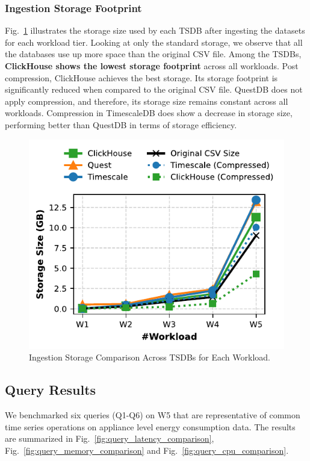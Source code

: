 \documentclass[conference]{IEEEtran}
\begin{document}
\subsubsection{Ingestion Storage Footprint}
Fig.~\ref{fig:ingestion_storage_comparison} illustrates the storage size used by each TSDB after ingesting the datasets for each workload tier. Looking at only the standard storage, we observe that all the databases use up more space than the original CSV file. Among the TSDBs, \textbf{ClickHouse shows the lowest storage footprint} across all workloads. Post compression, ClickHouse achieves the best storage. Its storage footprint is significantly reduced when compared to the original CSV file. QuestDB does not apply compression, and therefore, its storage size remains constant across all workloads. Compression in TimescaleDB does show a decrease in storage size, performing better than QuestDB in terms of storage efficiency.
\begin{figure}[tb]
\centering
\includegraphics[width=0.8\linewidth]{3_ing_storage_plot.pdf}
\caption{Ingestion Storage Comparison Across TSDBs for Each Workload.}
\label{fig:ingestion_storage_comparison}
\end{figure}

\subsection{Query Results}
We benchmarked six queries (Q1-Q6) on W5 that are representative of common time series operations on appliance level energy consumption data. The results are summarized in Fig.~\ref{fig:query_latency_comparison}, Fig.~\ref{fig:query_memory_comparison} and Fig.~\ref{fig:query_cpu_comparison}.
\end{document}
